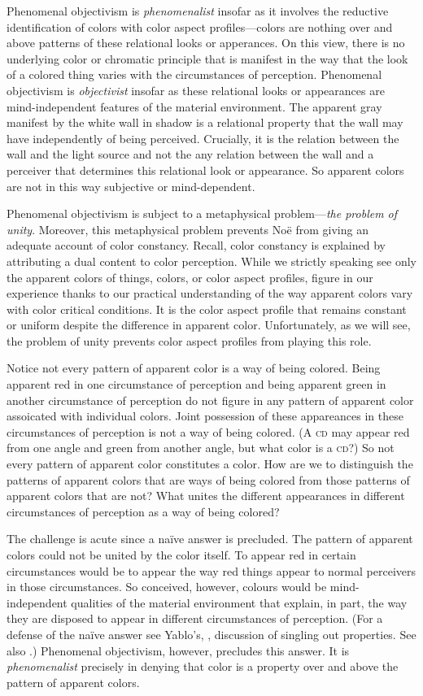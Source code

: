 \documentclass[12pt]{article}
\begin{document}
Phenomenal objectivism is \emph{phenomenalist} insofar as it involves the reductive identification of colors with color aspect profiles---colors are nothing over and above patterns of these relational looks or apperances. On this view, there is no underlying color or chromatic principle that is manifest in the way that the look of a colored thing varies with the circumstances of perception. Phenomenal objectivism is \emph{objectivist} insofar as these relational looks or appearances are mind-independent features of the material environment. The apparent gray manifest by the white wall in shadow is a relational property that the wall may have independently of being perceived. Crucially, it is the relation between the wall and the light source and not the any relation between the wall and a perceiver that determines this relational look or appearance. So apparent colors are not in this way subjective or mind-dependent.

Phenomenal objectivism is subject to a metaphysical problem---\emph{the problem of unity}. Moreover, this metaphysical problem prevents Noë from giving an adequate account of color constancy. Recall, color constancy is explained by attributing a dual content to color perception. While we strictly speaking see only the apparent colors of things, colors, or color aspect profiles, figure in our experience thanks to our practical understanding of the way apparent colors vary with color critical conditions. It is the color aspect profile that remains constant or uniform despite the difference in apparent color. Unfortunately, as we will see, the problem of unity prevents color aspect profiles from playing this role.

Notice not every pattern of apparent color is a way of being colored. Being apparent red in one circumstance of perception and being apparent green in another circumstance of perception do not figure in any pattern of apparent color assoicated with individual colors. Joint possession of these appareances in these circumstances of perception is not a way of being colored. (A \textsc{cd} may appear red from one angle and green from another angle, but what color is a \textsc{cd}?) So not every pattern of apparent color constitutes a color. How are we to distinguish the patterns of apparent colors that are ways of being colored from those patterns of apparent colors that are not? What unites the different appearances in different circumstances of perception as a way of being colored?

The challenge is acute since a naïve answer is precluded. The pattern of apparent colors could not be united by the color itself. To appear red in certain circumstances would be to appear the way red things appear to normal perceivers in those circumstances. So conceived, however, colours would be mind-in\-de\-pen\-dent qualities of the material environment that explain, in part, the way they are disposed to appear in different circumstances of perception. (For a defense of the na\"{i}ve answer see Yablo's, \citeyear{Yablo:1995fk}, discussion of singling out properties. See also \citealp{Campbell:1997dq}.) Phenomenal objectivism, however, precludes this answer. It is \emph{phenomenalist} precisely in denying that color is a property over and above the pattern of apparent colors. 
\end{document}
